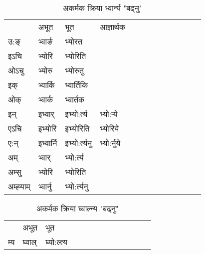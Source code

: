 \begin{table}[H]
\label{or.vi} \centering
\caption{अकर्मक क्रिया  भ्वार्न्य  "बढ्नु"  }
\begin{tabular}{l|l|l|l|l|l|l|l|l|l|l|l|l}  \toprule
&अभूत & भूत & आज्ञार्थक \\ 
उ:ङ्‌ &भ्वार्ङ &भ्योरत \\ 
इऽचि &भ्योरि &भ्योरिति   \\ 
ओऽचु &भ्योरु &भ्योरुतु   \\ 
इक् &भ्वार्कि &भ्वार्तिकि   \\ 
ओक् &भ्वार्क &भ्वार्तक   \\ 
इन् & इभ्वार् & इभ्यो:र्त्य &भ्यो:र्‍ये  \\ 
एऽचि & इभ्योरि & इभ्योरिति &भ्योरिये    \\ 
ए:न् & इभ्वार्नि  & इभ्यो:र्त्यनु &भ्यो:र्नुये  \\ 
अम् & भ्वार् & भ्यो:र्त्य   \\ 
अम्सु & भ्योरि & भ्योरिति   \\ 
अम्ह्‍याम् & भ्वार्नु  & भ्यो:र्त्यनु \\ 
\bottomrule
\end{tabular}
\end{table}


\begin{table}[H]
\label{ol.vi} \centering
\caption{अकर्मक क्रिया  घ्वाल्न्य  "बढ्नु"  }
\begin{tabular}{l|l|l|l|l|l|l|l|l|l|l|l|l}  \toprule
&अभूत & भूत   \\ 
म्य & घ्वाल् & घ्यो:ल्त्य   \\ 
\bottomrule
\end{tabular}
\end{table}


